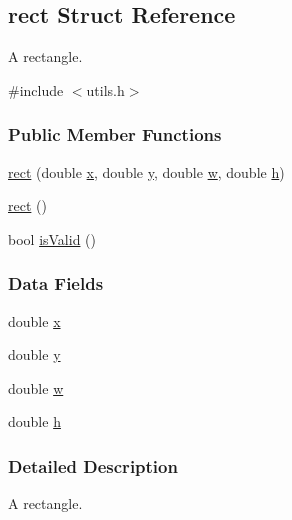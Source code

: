 \hypertarget{structrect}{\subsection{rect \-Struct \-Reference}
\label{structrect}
}


\-A rectangle.  




{\ttfamily \#include $<$utils.\-h$>$}

\subsubsection*{\-Public \-Member \-Functions}
\begin{DoxyCompactItemize}
\item 
\hyperlink{structrect_a828742c709b3b99d4aadb5a7c6a72d2f}{rect} (double \hyperlink{structrect_ac952440ed96ec3bd9debf8785a0c14d1}{x}, double \hyperlink{structrect_aed33fdc13b11486c1853cd473cd6505f}{y}, double \hyperlink{structrect_a1afcd50e56c883442733a453b43c317a}{w}, double \hyperlink{structrect_ad9b40821e105de13114d67d67ea12922}{h})
\item 
\hyperlink{structrect_adfa5e9b68b611d889413bec39d52817e}{rect} ()
\item 
bool \hyperlink{structrect_ab8d57002e66f342beecf69bade3de265}{is\-Valid} ()
\end{DoxyCompactItemize}
\subsubsection*{\-Data \-Fields}
\begin{DoxyCompactItemize}
\item 
double \hyperlink{structrect_ac952440ed96ec3bd9debf8785a0c14d1}{x}
\item 
double \hyperlink{structrect_aed33fdc13b11486c1853cd473cd6505f}{y}
\item 
double \hyperlink{structrect_a1afcd50e56c883442733a453b43c317a}{w}
\item 
double \hyperlink{structrect_ad9b40821e105de13114d67d67ea12922}{h}
\end{DoxyCompactItemize}


\subsubsection{\-Detailed \-Description}
\-A rectangle. 

